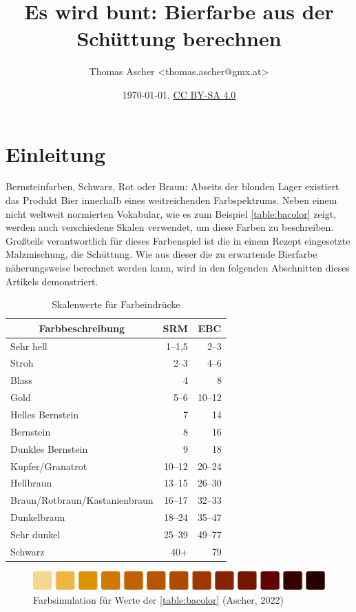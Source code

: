 \documentclass[a4paper,parskip=half]{scrartcl}
\title{Es wird bunt: Bierfarbe aus der Schüttung berechnen}
\author{Thomas Ascher <thomas.ascher@gmx.at>}
\date{\today, \href{http://creativecommons.org/licenses/by-sa/4.0/}{CC BY-SA 4.0}}
\begin{document}
\maketitle

\section*{Einleitung}

Bernsteinfarben, Schwarz, Rot oder Braun: Abseits der blonden Lager existiert das Produkt Bier innerhalb eines weitreichenden Farbspektrums. Neben einem nicht weltweit normierten Vokabular, wie es zum Beispiel \autoref{table:bacolor} zeigt, werden auch verschiedene Skalen verwendet, um diese Farben zu beschreiben. Großteils verantwortlich für dieses Farbenspiel ist die in einem Rezept eingesetzte Malzmischung, die Schüttung. Wie aus dieser die zu erwartende Bierfarbe näherungsweise berechnet werden kann, wird in den folgenden Abschnitten dieses Artikels demonstriert.

\begin{table}[H]
\centering
\begin{tabular}{lrr}
\toprule
\multicolumn{1}{c}{\textbf{Farbbeschreibung}} & \multicolumn{1}{c}{\textbf{SRM}} & \multicolumn{1}{c}{\textbf{EBC}} \\
\midrule
Sehr hell & 1–1,5 & 2–3  \\
Stroh & 2–3 & 4–6 \\
Blass & 4 & 8 \\
Gold & 5–6 & 10–12 \\
Helles Bernstein & 7 & 14 \\
Bernstein & 8 & 16 \\
Dunkles Bernstein & 9 & 18 \\
Kupfer/Granatrot & 10–12 & 20–24 \\
Hellbraun & 13–15 & 26–30 \\
Braun/Rotbraun/Kastanienbraun & 16–17 & 32–33 \\
Dunkelbraun & 18–24 & 35–47 \\
Sehr dunkel & 25–39 & 49–77 \\
Schwarz & 40+ & 79 \\
\bottomrule
\end{tabular}
\caption{Skalenwerte für Farbeindrücke \parencite{BA2021}}
\label{table:bacolor}
\end{table}

\begin{figure}[h]
\centering
\includegraphics[width=14cm]{colorscale.pdf}
\caption{Farbsimulation für Werte der \autoref{table:bacolor} (Ascher, 2022)}
\label{fig:bacolorscale}
\end{figure}
\end{document}
